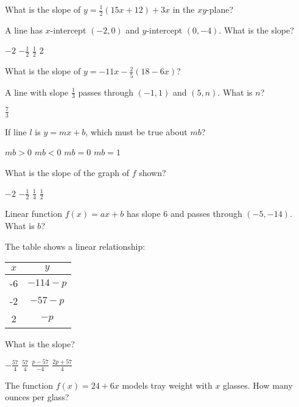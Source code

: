 \documentclass[12pt]{exam}
\begin{document}
\begin{questions}
\question What is the slope of $y = \frac{1}{2}(15x + 12) + 3x$ in the $xy$-plane?

\question A line has $x$-intercept $(-2,0)$ and $y$-intercept $(0,-4)$. What is the slope?
\begin{choices}
\choice $-2$
\choice $-\frac{1}{2}$
\choice $\frac{1}{2}$
\choice $2$
\end{choices}

\question What is the slope of $y = -11x - \frac{2}{5}(18 - 6x)$?

\question A line with slope $\frac{1}{3}$ passes through $(-1,1)$ and $(5,n)$. What is $n$?
\begin{choices}
\choice $\frac{7}{3}$
\end{choices}

\question If line $l$ is $y = mx + b$, which must be true about $mb$?
\begin{choices}
\choice $mb > 0$
\choice $mb < 0$
\choice $mb = 0$
\choice $mb = 1$
\end{choices}

\question What is the slope of the graph of $f$ shown?
\begin{choices}
\choice $-2$
\choice $-\frac{1}{2}$
\choice $\frac{1}{4}$
\choice $\frac{1}{2}$
\end{choices}

\question Linear function $f(x) = ax + b$ has slope 6 and passes through $(-5,-14)$. What is $b$?

\question The table shows a linear relationship:
\begin{center}
\begin{tabular}{|c|c|}
\hline
$x$ & $y$ \\
\hline
-6 & $-114 - p$ \\
-2 & $-57 - p$ \\
2 & $-p$ \\
\hline
\end{tabular}
\end{center}
What is the slope?
\begin{choices}
\choice $-\frac{57}{4}$
\choice $\frac{57}{4}$
\choice $\frac{p - 57}{-4}$
\choice $\frac{2p + 57}{4}$
\end{choices}

\question The function $f(x) = 24 + 6x$ models tray weight with $x$ glasses. How many ounces per glass?
\begin{choices}
\end{choices}


\end{questions}
\end{document}
